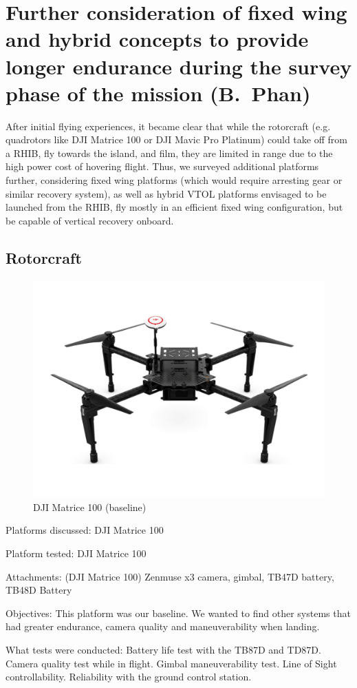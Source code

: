 \section{Further consideration of fixed wing and hybrid concepts to provide longer endurance during the survey phase of the mission (B.~Phan)}
\label{sec:fixedwing}

After initial flying experiences, it became clear that while the rotorcraft (e.g. quadrotors like DJI Matrice 100 or DJI Mavic Pro Platinum) could take off from a RHIB, fly towards the island, and film, they are limited in range due to the high power cost of hovering flight. Thus, we surveyed additional platforms further, considering fixed wing platforms (which would require arresting gear or similar recovery system), as well as hybrid VTOL platforms envisaged to be launched from the RHIB, fly mostly in an efficient fixed wing configuration, but be capable of vertical recovery onboard. 

\subsection{Rotorcraft}
\begin{figure}
\begin{center}
\includegraphics[width=0.49\columnwidth]{figures/survey1.png}
\end{center}
\caption{DJI Matrice 100 (baseline)}
\end{figure}

Platforms discussed: DJI Matrice 100

Platform tested: DJI Matrice 100

Attachments: (DJI Matrice 100) Zenmuse x3 camera, gimbal, TB47D battery, TB48D Battery

Objectives: This platform was our baseline. We wanted to find other systems that had greater endurance, camera quality and maneuverability when landing.

What tests were conducted: Battery life test with the TB87D and TD87D. Camera quality test while in flight. Gimbal maneuverability test. Line of Sight controllability. Reliability with the ground control station.

